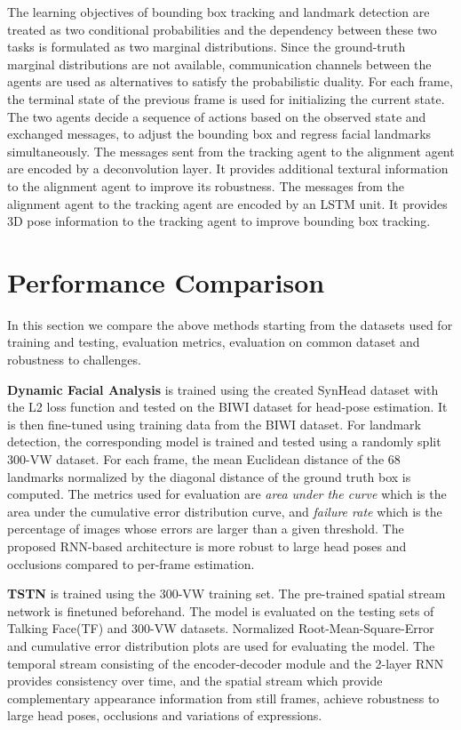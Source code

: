 \documentclass{llncs}
\begin{document}
	The learning objectives of bounding box tracking and landmark detection are treated as two conditional probabilities and the dependency between these two tasks is formulated as two marginal distributions. Since the ground-truth marginal distributions are not available, communication channels between the agents are used as alternatives to satisfy the probabilistic duality. For each frame, the terminal state of the previous frame is used for initializing the current state. The two agents decide a sequence of actions based on the observed state and exchanged messages, to adjust the bounding box and regress facial landmarks simultaneously. The messages sent from the tracking agent to the alignment agent are encoded by a deconvolution layer. It provides additional textural information to the alignment agent to improve its robustness. The messages from the alignment agent to the tracking agent are encoded by an LSTM unit. It provides 3D pose information to the tracking agent to improve bounding box tracking.
	


	\section{Performance Comparison}
	In this section we compare the above methods starting from the datasets used for training and testing, evaluation metrics, evaluation on common dataset and robustness to challenges.
	
	\textbf{Dynamic Facial Analysis} \cite{dynamic_facial_analysis} is trained using the created SynHead dataset with the L2 loss function and tested on the BIWI dataset for head-pose estimation. It is then fine-tuned using training data from the BIWI dataset. For landmark detection, the corresponding model is trained and tested using a randomly split 300-VW dataset. For each frame, the mean Euclidean distance of the 68 landmarks normalized by the diagonal distance of the ground truth box is computed. The metrics used for evaluation are \textit{area under the curve} which is the area under the cumulative error distribution curve, and \textit{failure rate} which is the percentage of images whose errors are larger than a given threshold. The proposed RNN-based architecture is more robust to large head poses and occlusions compared to per-frame estimation.
	
	\textbf{TSTN} \cite{tstn} is trained using the 300-VW training set. The pre-trained spatial stream network is finetuned beforehand. The model is evaluated on the testing sets of Talking Face(TF) and 300-VW datasets. Normalized Root-Mean-Square-Error and cumulative error distribution plots are used for evaluating the model. The temporal stream consisting of the encoder-decoder module and the 2-layer RNN provides consistency over time, and the spatial stream which provide complementary appearance information from still frames, achieve robustness to large head poses, occlusions and variations of expressions.
	
\end{document}
